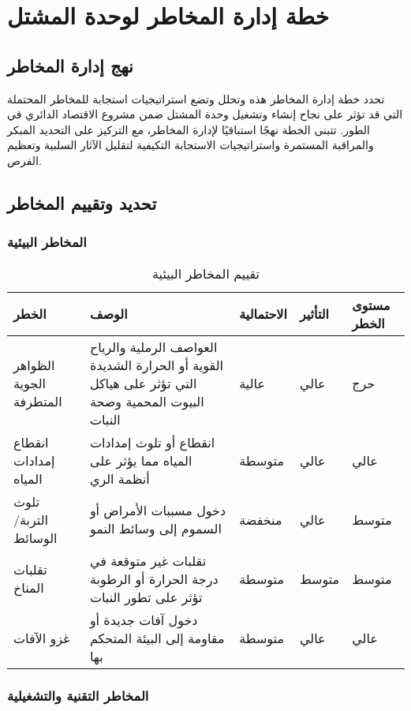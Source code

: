 \section{خطة إدارة المخاطر لوحدة المشتل}

\subsection{نهج إدارة المخاطر}
تحدد خطة إدارة المخاطر هذه وتحلل وتضع استراتيجيات استجابة للمخاطر المحتملة التي قد تؤثر على نجاح إنشاء وتشغيل وحدة المشتل ضمن مشروع الاقتصاد الدائري في الطور. تتبنى الخطة نهجًا استباقيًا لإدارة المخاطر، مع التركيز على التحديد المبكر والمراقبة المستمرة واستراتيجيات الاستجابة التكيفية لتقليل الآثار السلبية وتعظيم الفرص.

\subsection{تحديد وتقييم المخاطر}

\subsubsection{المخاطر البيئية}

\begin{table}[h]
\centering
\begin{tabular}{|p{3cm}|p{4cm}|p{2cm}|p{2cm}|p{3cm}|}
\hline
\textbf{الخطر} & \textbf{الوصف} & \textbf{الاحتمالية} & \textbf{التأثير} & \textbf{مستوى الخطر} \\
\hline
الظواهر الجوية المتطرفة & العواصف الرملية والرياح القوية أو الحرارة الشديدة التي تؤثر على هياكل البيوت المحمية وصحة النبات & عالية & عالي & حرج \\
\hline
انقطاع إمدادات المياه & انقطاع أو تلوث إمدادات المياه مما يؤثر على أنظمة الري & متوسطة & عالي & عالي \\
\hline
تلوث التربة/الوسائط & دخول مسببات الأمراض أو السموم إلى وسائط النمو & منخفضة & عالي & متوسط \\
\hline
تقلبات المناخ & تقلبات غير متوقعة في درجة الحرارة أو الرطوبة تؤثر على تطور النبات & متوسطة & متوسط & متوسط \\
\hline
غزو الآفات & دخول آفات جديدة أو مقاومة إلى البيئة المتحكم بها & متوسطة & عالي & عالي \\
\hline
\end{tabular}
\caption{تقييم المخاطر البيئية}
\end{table}

\subsubsection{المخاطر التقنية والتشغيلية}

